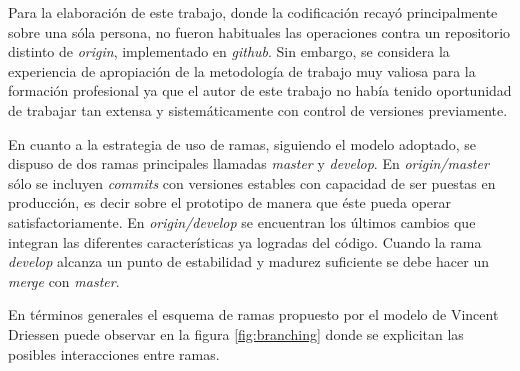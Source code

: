 Para la elaboración de este trabajo, donde la codificación recayó principalmente sobre una sóla persona, no fueron habituales las operaciones contra un repositorio distinto de \textit{origin}, implementado en \textit{github}. Sin embargo, se considera la experiencia de apropiación de la metodología de trabajo muy valiosa para la formación profesional ya que el autor de este trabajo no había tenido oportunidad de trabajar tan extensa y sistemáticamente con control de versiones previamente.

En cuanto a la estrategia de uso de ramas, siguiendo el modelo adoptado, se dispuso de dos ramas principales llamadas \textit{master} y \textit{develop}.  En \textit{origin/master} sólo se incluyen \textit{commits} con versiones estables con capacidad de ser puestas en producción, es decir sobre el prototipo de manera que éste pueda operar satisfactoriamente.  En \textit{origin/develop} se encuentran  los últimos cambios que integran las diferentes características ya logradas del código.  Cuando la rama \textit{develop} alcanza un punto de estabilidad y madurez suficiente se debe hacer un \textit{merge} con \textit{master}.%

En términos generales el esquema de ramas propuesto por el modelo de Vincent Driessen puede observar en la figura  \ref{fig:branching} donde se explicitan las posibles interacciones entre ramas.

